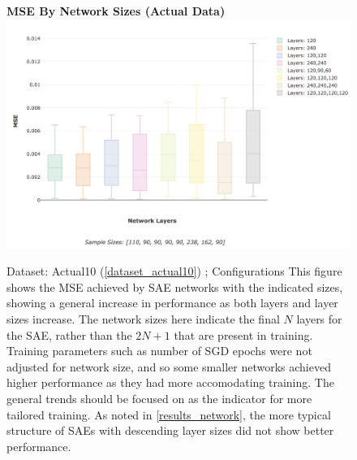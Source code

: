 \documentclass[a4paper,11pt,oneside]{article}
\theoremstyle{plain}
\theoremstyle{definition}
\begin{document}
\begin{figure}[H]
	\centering 
	\textbf{MSE By Network Sizes (Actual Data)}
	\includegraphics[scale=0.25]{images/results/network/actual_sae_mse_box.png} 
	\caption{Dataset: Actual10 (\ref{dataset_actual10}) ; Configurations 
		\newline This figure shows the MSE achieved by SAE networks with the indicated sizes, showing a general increase in performance as both layers and layer sizes increase. The network sizes here indicate the final $N$ layers for the SAE, rather than the $2N + 1$ that are present in training. Training parameters such as number of SGD epochs were not adjusted for network size, and so some smaller networks achieved higher performance as they had more accomodating training. The general trends should be focused on as the indicator for more tailored training. As noted in \ref{results_network}, the more typical structure of SAEs with descending layer sizes did not show better performance.}
	\label{figure-actual_sae_mse_box}
\end{figure}
\end{document}
